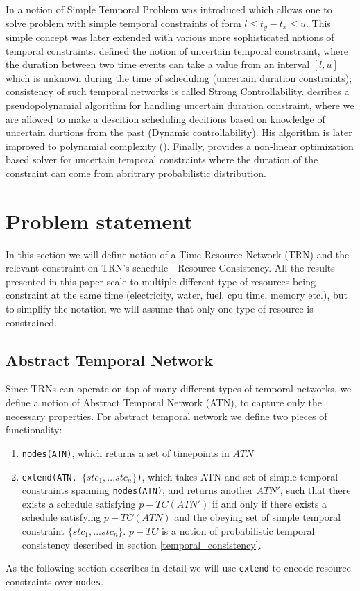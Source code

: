 \documentclass{article}
\begin{document}
\begin{multicols}{2}
In \cite{dechter1991temporal} a notion of Simple Temporal Problem was introduced which allows one to solve problem with simple temporal constraints of form $l \leq t_y - t_x \leq u$. This simple concept was later extended with various more sophisticated notions of temporal constraints. \cite{vidal1996dealing} defined the notion of uncertain temporal constraint, where the duration between two time events can take a value from an interval $[l,u]$ which is unknown during the time of scheduling (uncertain duration constraints); consistency of such temporal networks is called Strong Controllability. \cite{morris2001dynamic} desribes a pseudopolynamial algorithm for handling uncertain duration constraint, where we are allowed to make a descition scheduling decitions based on knowledge of uncertain durtions from the past (Dynamic controllability). His algorithm is later improved to polynamial complexity (\cite{morris2005temporal}). Finally, \cite{Fang2014} provides a non-linear optimization based solver for uncertain temporal constraints where the duration of the constraint can come from abritrary probabilistic distribution.

\section{Problem statement}
In this section we will define notion of a Time Resource Network (TRN) and the relevant constraint on TRN's schedule - Resource Consistency. All the results presented in this paper scale to multiple different type of resources being constraint at the same time (electricity, water, fuel, cpu time, memory etc.), but to simplify the notation we will assume that only one type of resource is constrained.
\subsection{Abstract Temporal Network}
Since TRNs can operate on top of many different types of temporal networks, we define a notion of Abstract Temporal Network (ATN), to capture only the necessary properties. For abstract temporal network we define two pieces of functionality:
\begin{enumerate}
\item \texttt{nodes(ATN)}, which returns a set of timepoints in $ATN$
\item \texttt{extend(ATN, $\{ stc_1, ... stc_n \} $)}, which takes ATN and set of simple temporal constraints \cite{cervoni1993maintaining} spanning \texttt{nodes(ATN)}, and returns another $ATN'$, such that there exists a schedule satisfying $p-TC(ATN')$ if and only if there exists a schedule satisfying $p-TC(ATN)$ and the obeying set of simple temporal constraint $\{ stc_1, ... stc_n \} $. $p-TC$ is a notion of probabilistic temporal consistency described in section \ref{temporal_consistency}.
\end{enumerate}
As the following section describes in detail we will use \texttt{extend} to encode resource constraints over \texttt{nodes}.

\end{multicols}
\end{document}
